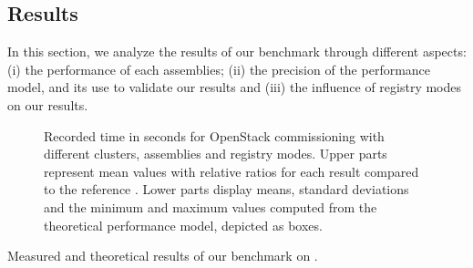 \subsection{Results}

In this section, we analyze the results of our benchmark through
different aspects: (i) the performance of each assemblies; (ii) the
precision of the performance model, and its use to validate our
results and (iii) the influence of registry modes on our results.

\begin{figure}[t!]
  \begin{center}
    \def\svgwidth{\columnwidth}
    \def\svgwidth{\columnwidth}
    \caption{Recorded time in seconds for OpenStack commissioning with
      different clusters, assemblies and registry modes. Upper parts
      represent mean values with relative ratios for each result
      compared to the reference \ansass.  Lower parts display means,
      standard deviations and the minimum and maximum values computed
      from the theoretical performance model, depicted as boxes.}
    \label{fig:openstack_results}
  \end{center}
\end{figure}

\begin{table}
    \begin{center}
        
        \caption{Measured and theoretical results of our benchmark on \ecotype.}
        \label{tab:openstack_results}
    \end{center}
\end{table}

